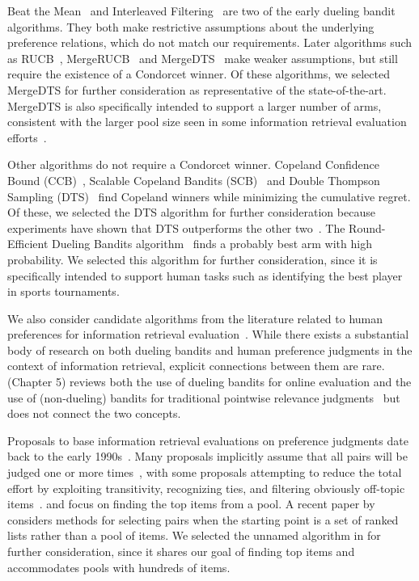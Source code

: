 Beat the Mean~\cite{yue11} and Interleaved Filtering~\cite{yue12} are two of the early dueling bandit algorithms. They both make restrictive assumptions about the underlying preference relations, which do not match our requirements. Later algorithms such as RUCB~\cite{rucb}, MergeRUCB~\cite{mergerucb} and MergeDTS~\cite{mergedts} make weaker assumptions, but still require the existence of a Condorcet winner. Of these algorithms, we selected MergeDTS for further consideration as representative of the state-of-the-art. MergeDTS is also specifically intended to support a larger number of arms, consistent with the larger pool size seen in some information retrieval evaluation efforts~\cite{DL21}.

Other algorithms do not require a Condorcet winner. Copeland Confidence Bound (CCB)~\cite{zoghi2015copeland}, Scalable Copeland Bandits (SCB)~\cite{zoghi2015copeland} and Double Thompson Sampling (DTS)~\cite{dts} find Copeland winners while minimizing the cumulative regret. Of these, we selected the DTS algorithm for further consideration because experiments have shown that DTS outperforms the other two~\cite{dts}. The Round-Efficient Dueling Bandits algorithm~\cite{ll18} finds a probably best arm with high probability. We selected this algorithm for further consideration, since it is specifically intended to support human tasks such as identifying the best player in sports tournaments.

We also consider candidate algorithms from the literature related to human preferences for information retrieval evaluation~\cite{cbcd08,cvs21,sz20,xie20,hb17a,rcmd22}. While there exists a substantial body of research on both dueling bandits and human preference judgments in the context of information retrieval, explicit connections between them are rare. \citet{bandits19} (Chapter 5) reviews both the use of dueling bandits for online evaluation and the use of (non-dueling) bandits for traditional pointwise relevance judgments~\cite{lpb16} but does not connect the two concepts.

Proposals to base information retrieval evaluations on preference judgments date back to the early 1990s~\cite{fs91,rorvig90,yao95}. Many proposals implicitly assume that all pairs will be judged one or more times~\cite{avyc21, cbcd08, sz20}, with some proposals attempting to reduce the total effort by exploiting transitivity, recognizing ties, and filtering obviously off-topic items~\cite{hb17a,cbcd08}.  \citet{cvs21} and \citet{avyc21} focus on finding the top items from a pool. A recent paper by \citet{rcmd22} considers methods for selecting pairs when the starting point is a set of ranked lists rather than a pool of items. We selected the unnamed algorithm in \citet{cvs21} for further consideration, since it shares our goal of finding top items and accommodates pools with hundreds of items. 

